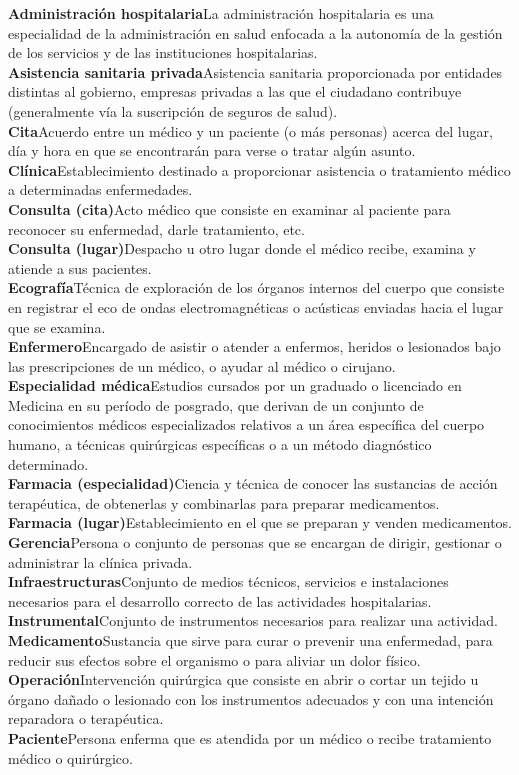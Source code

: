 \documentclass[11pt,a4paper]{article}
\newcommand{\term}[2]{\textbf{#1}\quad#2\\}
\begin{document}
	\term{Administración hospitalaria}{La administración hospitalaria es una especialidad de la administración en salud enfocada a la autonomía de la gestión de los servicios y de las instituciones hospitalarias.}
	\term{Asistencia sanitaria privada}{Asistencia sanitaria proporcionada por entidades distintas al gobierno, empresas privadas a las que el ciudadano contribuye (generalmente vía la suscripción de seguros de salud).}
	\term{Cita}{Acuerdo entre un médico y un paciente (o más personas) acerca del lugar, día y hora en que se encontrarán para verse o tratar algún asunto.}
	\term{Clínica}{Establecimiento destinado a proporcionar asistencia o tratamiento médico a determinadas enfermedades.}
	\term{Consulta (cita)}{Acto médico que consiste en examinar al paciente para reconocer su enfermedad, darle tratamiento, etc.}
	\term{Consulta (lugar)}{Despacho u otro lugar donde el médico recibe, examina y atiende a sus pacientes.}
	\term{Ecografía}{Técnica de exploración de los órganos internos del cuerpo que consiste en registrar el eco de ondas electromagnéticas o acústicas enviadas hacia el lugar que se examina.}
	\term{Enfermero}{Encargado de asistir o atender a enfermos, heridos o lesionados bajo las prescripciones de un médico, o ayudar al médico o cirujano.}
	\term{Especialidad médica}{Estudios cursados por un graduado o licenciado en Medicina en su período de posgrado, que derivan de un conjunto de conocimientos médicos especializados relativos a un área específica del cuerpo humano, a técnicas quirúrgicas específicas o a un método diagnóstico determinado.}
	\term{Farmacia (especialidad)}{Ciencia y técnica de conocer las sustancias de acción terapéutica, de obtenerlas y combinarlas para preparar medicamentos.}
	\term{Farmacia (lugar)}{Establecimiento en el que se preparan y venden medicamentos.}
	\term{Gerencia}{Persona o conjunto de personas que se encargan de dirigir, gestionar o administrar la clínica privada.}
	\term{Infraestructuras}{Conjunto de medios técnicos, servicios e instalaciones necesarios para el desarrollo correcto de las actividades hospitalarias.}
	\term{Instrumental}{Conjunto de instrumentos necesarios para realizar una actividad.}
	\term{Medicamento}{Sustancia que sirve para curar o prevenir una enfermedad, para reducir sus efectos sobre el organismo o para aliviar un dolor físico.}
	\term{Operación}{Intervención quirúrgica que consiste en abrir o cortar un tejido u órgano dañado o lesionado con los instrumentos adecuados y con una intención reparadora o terapéutica.}
	\term{Paciente}{Persona enferma que es atendida por un médico o recibe tratamiento médico o quirúrgico.}
\end{document}
